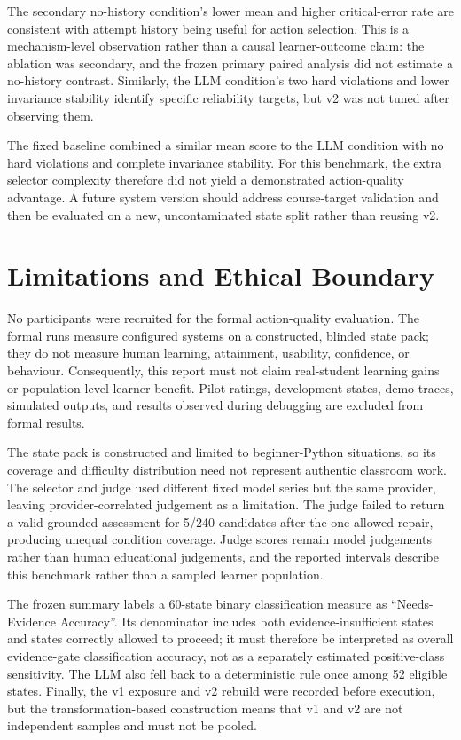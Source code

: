 \documentclass[final-report]{../project-plan/report-template}
\begin{document}
The secondary no-history condition's lower mean and higher critical-error rate
are consistent with attempt history being useful for action selection. This is
a mechanism-level observation rather than a causal learner-outcome claim: the
ablation was secondary, and the frozen primary paired analysis did not estimate
a no-history contrast. Similarly, the LLM condition's two hard violations and
lower invariance stability identify specific reliability targets, but v2 was
not tuned after observing them.

The fixed baseline combined a similar mean score to the LLM condition with no
hard violations and complete invariance stability. For this benchmark, the
extra selector complexity therefore did not yield a demonstrated action-quality
advantage. A future system version should address course-target validation and
then be evaluated on a new, uncontaminated state split rather than reusing v2.

\section{Limitations and Ethical Boundary}

No participants were recruited for the formal action-quality evaluation. The
formal runs measure configured systems on a constructed, blinded state pack;
they do not measure human learning, attainment, usability, confidence, or
behaviour. Consequently, this report must not claim real-student learning gains
or population-level learner benefit. Pilot ratings, development states, demo
traces, simulated outputs, and results observed during debugging are excluded
from formal results.

The state pack is constructed and limited to beginner-Python situations, so its
coverage and difficulty distribution need not represent authentic classroom
work. The selector and judge used different fixed model series but the same
provider, leaving provider-correlated judgement as a limitation. The judge
failed to return a valid grounded assessment for 5/240 candidates after the one
allowed repair, producing unequal condition coverage. Judge scores remain model
judgements rather than human educational judgements, and the reported intervals
describe this benchmark rather than a sampled learner population.

The frozen summary labels a 60-state binary classification measure as
``Needs-Evidence Accuracy''. Its denominator includes both evidence-insufficient
states and states correctly allowed to proceed; it must therefore be interpreted
as overall evidence-gate classification accuracy, not as a separately estimated
positive-class sensitivity. The LLM also fell back to a deterministic rule once
among 52 eligible states. Finally, the v1 exposure and v2 rebuild were recorded
before execution, but the transformation-based construction means that v1 and
v2 are not independent samples and must not be pooled.
\end{document}
